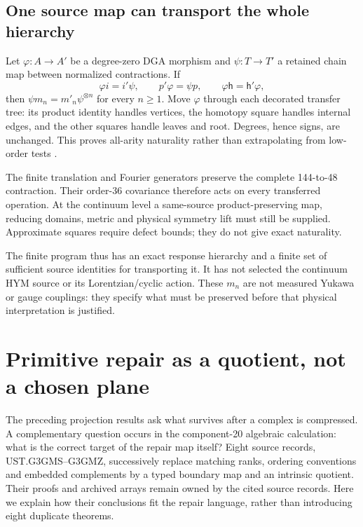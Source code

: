 \documentclass[11pt,a4paper]{article}
\begin{document}
\subsection{One source map can transport the whole hierarchy}
\label{sec:all-arity-source-map}
Let \(\varphi:A\to A'\) be a degree-zero DGA morphism and
\(\psi:T\to T'\) a retained chain map between normalized contractions.
If
\[
 \varphi i=i'\psi,\qquad p'\varphi=\psi p,
 \qquad\varphi\mathsf h=\mathsf h'\varphi,
\]
then \(\psi m_n=m'_n\psi^{\otimes n}\) for every \(n\geq1\).
Move \(\varphi\) through each decorated transfer tree: its product
identity handles vertices, the homotopy square handles internal edges,
and the other squares handle leaves and root. Degrees, hence signs,
are unchanged. This proves all-arity naturality rather than extrapolating
from low-order tests \cite{CBFAllArity2026}.

The finite translation and Fourier generators preserve the complete
144-to-48 contraction. Their order-36 covariance therefore acts on every
transferred operation. At the continuum level a same-source
product-preserving map, reducing domains, metric and physical symmetry
lift must still be supplied. Approximate squares require defect bounds;
they do not give exact naturality.

The finite program thus has an exact response hierarchy and a finite set
of sufficient source identities for transporting it. It has not selected
the continuum HYM source or its Lorentzian/cyclic action. These \(m_n\)
are not measured Yukawa or gauge couplings: they specify what must be
preserved before that physical interpretation is justified.

\section{Primitive repair as a quotient, not a chosen plane}
\label{sec:apolar-repair}

The preceding projection results ask what survives after a complex is
compressed. A complementary question occurs in the component-20 algebraic
calculation: what is the correct target of the repair map itself?
Eight source records, UST.G3GMS--G3GMZ, successively replace matching ranks,
ordering conventions and embedded complements by a typed boundary map and
an intrinsic quotient. Their proofs and archived arrays remain owned by the
cited source records. Here we explain how their conclusions fit the repair
language, rather than introducing eight duplicate theorems.
\end{document}

